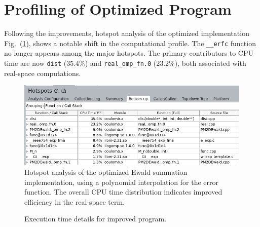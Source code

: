 \section{Profiling of Optimized Program}
Following the improvements, hotspot analysis of the optimized implementation Fig.~(\ref{fig:resultVTuneFinal}), shows a notable shift in the computational profile. The \texttt{\_\_erfc} function no longer appears among the major hotspots. The primary contributors to CPU time are now \texttt{dist} (35.4\%) and \texttt{real\_omp\_fn.0} (23.2\%), both associated with real-space computations. 
\begin{figure}[htbp]
    \centering
    \includegraphics[width = \linewidth]{images/VTuneFinalHotSpots.png}
    \caption{Hotspot analysis of the optimized Ewald summation implementation, using a polynomial interpolation for the error function. The overall CPU time distribution indicates improved efficiency in the real-space term.}
    \label{fig:resultVTuneFinal}
\end{figure}
\begin{figure}[htbp]
    \centering
    \begin{minipage}{0.7\textwidth}
    \end{minipage}%
    \begin{minipage}{0.3\textwidth}
        \caption{Execution time details for improved program.}
    \end{minipage}
\end{figure}

